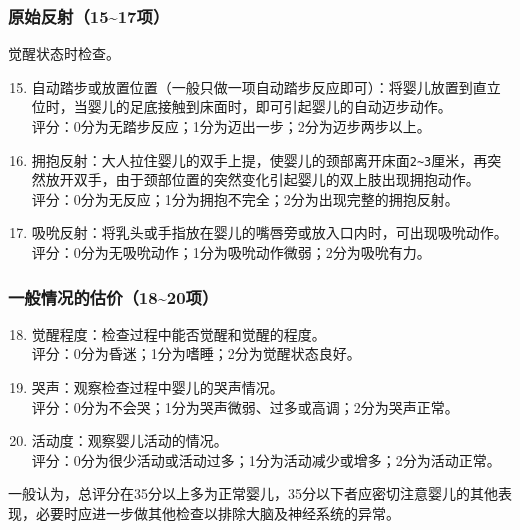 \subsubsection{原始反射（15\textasciitilde17项）}

觉醒状态时检查。

\begin{enumerate}
\setcounter{enumi}{14}
\item
  自动踏步或放置位置（一般只做一项自动踏步反应即可）：将婴儿放置到直立位时，当婴儿的足底接触到床面时，即可引起婴儿的自动迈步动作。\\
  评分：0分为无踏步反应；1分为迈出一步；2分为迈步两步以上。
\item
  拥抱反射：大人拉住婴儿的双手上提，使婴儿的颈部离开床面\texttt{2\textasciitilde{}3}\hspace{0pt}厘米，再突然放开双手，由于颈部位置的突然变化引起婴儿的双上肢出现拥抱动作。\\
  评分：0分为无反应；1分为拥抱不完全；2分为出现完整的拥抱反射。
\item
  吸吮反射：将乳头或手指放在婴儿的嘴唇旁或放入口内时，可出现吸吮动作。\\
  评分：0分为无吸吮动作；1分为吸吮动作微弱；2分为吸吮有力。
\end{enumerate}


\subsubsection{一般情况的估价（18\textasciitilde20项）}%

\begin{enumerate}
\setcounter{enumi}{17}
\item
  觉醒程度：检查过程中能否觉醒和觉醒的程度。\\
  评分：0分为昏迷；1分为嗜睡；2分为觉醒状态良好。
\item
  哭声：观察检查过程中婴儿的哭声情况。\\
  评分：0分为不会哭；1分为哭声微弱、过多或高调；2分为哭声正常。
\item
  活动度：观察婴儿活动的情况。\\
  评分：0分为很少活动或活动过多；1分为活动减少或增多；2分为活动正常。
\end{enumerate}

一般认为，总评分在35分以上多为正常婴儿，35分以下者应密切注意婴儿的其他表现，必要时应进一步做其他检查以排除大脑及神经系统的异常。


